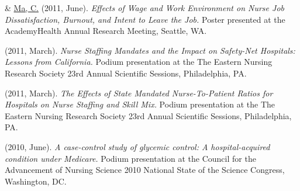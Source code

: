 \documentclass[10pt,]{article}
\begin{document}
{{{{{{{{{{{{{{\begin{hangparas}{.25in}{1}
\end{hangparas}

\vspace{4mm}

\begin{hangparas}{.25in}{1}

 \& {\underline {Ma, C.}} (2011, June). {\textit {Effects of Wage and Work Environment on Nurse Job Dissatisfaction, Burnout, and Intent to Leave the Job.}} Poster presented at the AcademyHealth Annual Research Meeting, Seattle, WA.

\end{hangparas}

\vspace{4mm}

\begin{hangparas}{.25in}{1}

 (2011, March). {\textit {Nurse Staffing Mandates and the Impact on Safety-Net Hospitals: Lessons from California.}} Podium presentation at the The Eastern Nursing Research Society 23rd Annual Scientific Sessions, Philadelphia, PA.

\end{hangparas}

\vspace{4mm}

\begin{hangparas}{.25in}{1}

 (2011, March). {\textit {The Effects of State Mandated Nurse-To-Patient Ratios for Hospitals on Nurse Staffing and Skill Mix.}} Podium presentation at the The Eastern Nursing Research Society 23rd Annual Scientific Sessions, Philadelphia, PA.

\end{hangparas}

\vspace{4mm}

\begin{hangparas}{.25in}{1}

 (2010, June). {\textit {A case-control study of glycemic control: A hospital-acquired condition under Medicare.}} Podium presentation at the Council for the Advancement of Nursing Science 2010 National State of the Science Congress, Washington, DC.

\end{hangparas}

\vspace{4mm}

}}}}}}}}}}}}}}
\end{document}
